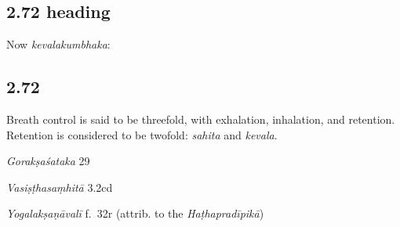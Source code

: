 \begin{ekdosis}

\subsection*{2.72 heading}
\begin{translation}[hp02_072a]
Now \emph{kevalakumbhaka}:
\end{translation}


\subsection*{2.72}
\begin{translation}[hp02_072]

Breath control is said to be threefold, with exhalation, inhalation, and retention. Retention is considered to be twofold: \emph{sahita} and \emph{kevala}.

\end{translation}

\begin{sources}[hp02_072]
\emph{Gorakṣaśataka} 29

\begin{versinnote}
\end{versinnote}

\emph{Vasiṣṭhasaṃhitā} 3.2cd

\begin{versinnote}
\end{versinnote}
\end{sources}

\begin{testimonia}[hp02_072]
\emph{Yogalakṣaṇāvalī} f.~32r (attrib. to the \emph{Haṭhapradīpikā})
\begin{versinnote}
\end{versinnote}


\end{testimonia}
\end{ekdosis}
